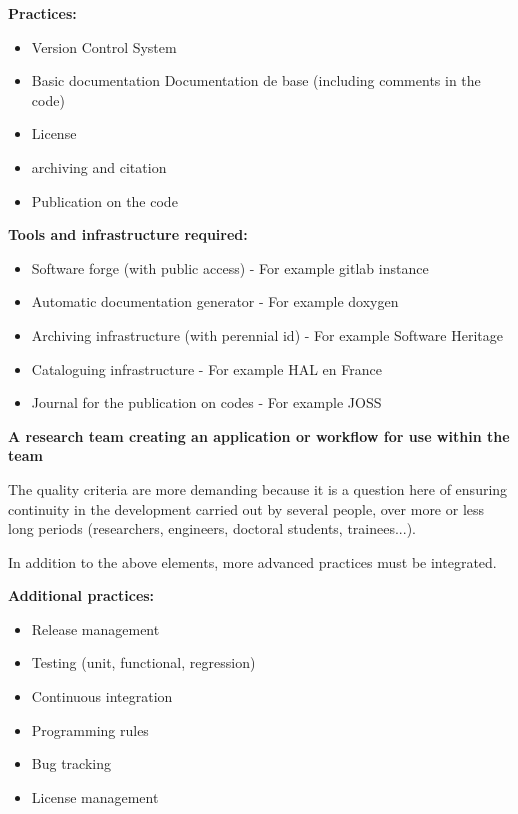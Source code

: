 {\bf Practices:}
\begin{itemize}
\item Version Control System
\item Basic documentation Documentation de base (including comments in the code)
\item License 
\item archiving and citation
\item Publication on the code
\end{itemize}

{\bf Tools and infrastructure required:}
\begin{itemize}
\item Software forge (with public access) - For example gitlab instance
\item Automatic documentation generator - For example doxygen
\item Archiving infrastructure (with perennial id) - For example Software Heritage
\item Cataloguing infrastructure - For example HAL en France
\item Journal for the publication on codes - For example JOSS
\end{itemize}


\textbf{A research team creating an application or workflow for use within the team}

The quality criteria are more demanding because it is a question here
of ensuring continuity in the development carried out by several
people, over more or less long periods (researchers, engineers,
doctoral students, trainees...).

In addition to the above elements, more advanced practices must be
integrated.

{\bf Additional practices:}
\begin{itemize}
\item Release management
\item Testing (unit, functional, regression)
\item Continuous integration
\item Programming rules
\item Bug tracking
\item License management
\end{itemize}

